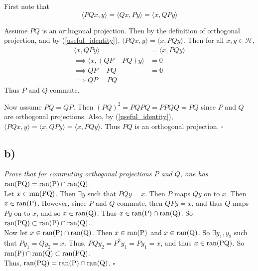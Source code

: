 \documentclass[12pt]{article}
\theoremstyle{plain}
\begin{document}
First note that
\begin{equation}
    \label{useful_identity}
    \langle PQx,y \rangle = \langle Qx, Py \rangle = \langle x, QPy \rangle
\end{equation}

Assume $PQ$ is an orthogonal projection.  Then by the definition of orthogonal projection, and by (\ref{useful_identity}), $\langle PQx, y\rangle = \langle x, PQy \rangle$.  Then for all $x, y \in \mathcal{H}$,
\begin{align*}
    \langle x, QPy \rangle &= \langle x, PQy \rangle \\
    \implies \langle x, (QP - PQ)y \rangle &= 0 \\
    \implies QP - PQ &= \mathbb{0} \\
    \implies QP = PQ
\end{align*}
Thus $P$ and $Q$ commute.

Now assume $PQ = QP$.  Then $(PQ)^2 = PQPQ = PPQQ = PQ$ since $P$ and $Q$ are orthogonal projections.  Also, by (\ref{useful_identity}), $\langle PQx, y\rangle = \langle x, QPy \rangle = \langle x, PQy \rangle$.  Thus $PQ$ is an orthogonal projection. \hfill $\square$

\subsection*{ b)}
\emph{Prove that for commuting orthogonal projections $P$ and $Q$, one has $\rm{ran}(PQ) = \rm{ran}(P)\cap\rm{ran}(Q)$.} \\

Let $x \in \rm{ran}(PQ)$.  Then $\exists y$ such that $PQy = x$.  Then $P$ maps $Qy$ on to $x$.  Then $x \in \rm{ran}(P)$.  However, since $P$ and $Q$ commute, then $QPy = x$, and thus $Q$ maps $Py$ on to $x$, and so $x \in \rm{ran}(Q)$.  Thus $x \in \rm{ran}(P)\cap\rm{ran}(Q)$.  So $\rm{ran}(PQ) \subset \rm{ran}(P)\cap\rm{ran}(Q)$. \\

Now let $x \in \rm{ran}(P)\cap\rm{ran}(Q)$.  Then $x \in \rm{ran}(P)$ and $x \in \rm{ran}(Q)$.  So $\exists y_1, y_2$ such that $Py_1 = Qy_2 = x$.  Thus, $PQy_2 = P^2y_1 = Py_1 = x$, and thus $x \in \rm{ran}(PQ)$.  So $\rm{ran}(P)\cap\rm{ran}(Q) \subset \rm{ran}(PQ)$. \\

Thus, $\rm{ran}(PQ) = \rm{ran}(P)\cap\rm{ran}(Q)$. \hfill $\square$

\end{document}
